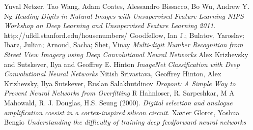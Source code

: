 \documentclass[12pt]{article}
\begin{document}
\begin{thebibliography}{9}
Yuval Netzer, Tao Wang, Adam Coates, Alessandro Bissacco, Bo Wu, Andrew Y. Ng 
\textit{Reading Digits in Natural Images with Unsupervised Feature Learning NIPS Workshop on Deep Learning and Unsupervised Feature Learning 2011.}
http://ufldl.stanford.edu/housenumbers/
Goodfellow, Ian J.; Bulatov, Yaroslav; Ibarz, Julian; Arnoud, Sacha; Shet, Vinay
\textit{Multi-digit Number Recognition from Street View Imagery using Deep Convolutional Neural Networks}
Alex Krizhevsky and Sutskever, Ilya and Geoffrey E. Hinton
\textit{ImageNet Classification with Deep Convolutional Neural Networks}
Nitish Srivastava, Geoffrey Hinton, Alex Krizhevsky, Ilya Sutskever, Ruslan Salakhutdinov
\textit{Dropout: A Simple Way to Prevent Neural Networks from Overfitting}
R Hahnloser, R. Sarpeshkar, M A Mahowald, R. J. Douglas, H.S. Seung (2000). 
\textit{Digital selection and analogue amplification coesist in a cortex-inspired silicon circuit.}
Xavier Glorot, Yoshua Bengio
\textit{Understanding the difficulty of training deep feedforward neural networks}

\end{thebibliography}
	
\end{document}
